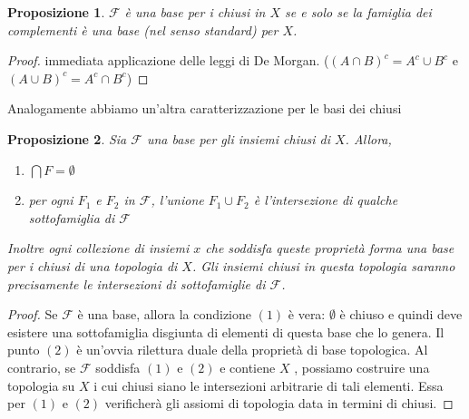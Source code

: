 \documentclass[10pt,a4paper]{article}
\theoremstyle{definition}
\theoremstyle{plain}
\newtheorem{prop}{Proposizione}
\theoremstyle{remark}
\newtheorem{rem}{Remark}
\theoremstyle{remark}
\newcommand{\R}{\mathbb{R}}
\newcommand{\F}{\mathcal{F}}
\begin{document}
\begin{prop} $\F$ è una base per i chiusi in $X$ se e solo se la famiglia dei
complementi è una base (nel senso standard) per $X$.
\end{prop}
\begin{proof} immediata applicazione delle leggi di De Morgan. ($(A \cap B)^c=
A^c \cup B^c$ e $(A \cup B)^c= A^c \cap B^c$)
\end{proof}

Analogamente abbiamo un'altra caratterizzazione per le basi dei chiusi

\begin{prop} Sia $\F$ una base per gli insiemi chiusi di $X$. Allora,
\begin{enumerate}
\item $\bigcap F = \emptyset$
\item per ogni $F_1$ e $F_2$ in $\F$, l'unione $F_1 \cup F_2$ è l'intersezione
di qualche sottofamiglia di $\F$
\end{enumerate} Inoltre ogni collezione di insiemi $x$ che soddisfa queste
proprietà forma una base per i chiusi di una topologia di $X$. Gli insiemi
chiusi in questa topologia saranno precisamente le intersezioni di sottofamiglie
di $\F$.
\end{prop}
\begin{proof} Se $\F$ è una base, allora la condizione $(1)$ è vera: $\emptyset$
è chiuso e quindi deve esistere una sottofamiglia disgiunta di elementi di
questa base che lo genera. Il punto $(2)$ è un'ovvia rilettura duale della
proprietà di base topologica. Al contrario, se $\F$ soddisfa $(1)$ e $(2)$ e
contiene $X$ , possiamo costruire una topologia su $X$ i cui chiusi siano le
intersezioni arbitrarie di tali elementi. Essa per $(1)$ e $(2)$ verificherà gli
assiomi di topologia data in termini di chiusi.
%
\end{proof}

\end{document}
